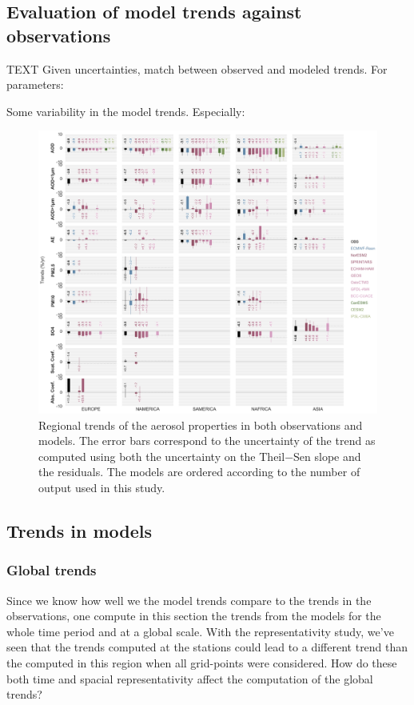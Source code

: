 \documentclass[journal abbreviation, manuscript]{copernicus}
\begin{document}
\subsection{Evaluation of model trends against observations}
TEXT
Given uncertainties, match between observed and modeled trends. For parameters:

Some variability in the model trends. Especially:


\begin{figure}[t]
 \includegraphics[width=12cm]{../scripts/figs/heatmaps/BARS.png}
 \caption{Regional trends of the aerosol properties in both observations and models. The error bars correspond to the uncertainty of the trend as computed using both the uncertainty on the Theil−Sen slope and the residuals. The models are ordered according to the number of output used in this study.}
 \label{bars}
\end{figure}

\subsection{Trends in models}

\subsubsection{Global trends}

Since we know how well we the model trends compare to the trends in the observations, one compute in this section the trends from the models for the whole time period and at a global scale. With the representativity study, we've seen that the trends computed at the stations could lead to a different trend than the computed in this region when all grid-points were considered. How do these both time and spacial representativity affect the computation of the global trends?
\end{document}
